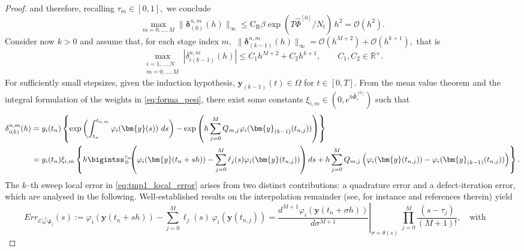 \documentclass[a4paper,num-refs]{oup-contemporary-spidec}
\begin{document}
\begin{proof}
    and therefore, recalling $\tau_m\in[0,1],$ we conclude
    \begin{equation*}
        \max_{m=0,\dots,M}\|\bm{\delta}^{n,m}_{(0)}(h)\|_\infty\leq \mathrm{C}_\mathrm{R}\beta \exp{(T\hat{\Phi}^{[0]}/N_t)} \, h^2 =\mathcal{O}(h^2).
    \end{equation*}
    Consider now $k>0$ and assume that, for each stage index $m,$ $\|\bm{\delta}^{n,m}_{(k-1)}(h)\|_\infty=\mathcal{O}(h^{M+2})+\mathcal{O}(h^{k+1}),$ that is
     \begin{equation}\label{eq:Induction_Hp}
        \max_{\substack{i=1,\dots,N \\ m=0,\dots,M}}|\delta^{n,m}_{i(k-1)}(h)|\leq C_1h^{M+2}+C_2h^{k+1}, \qquad C_1,C_2\in \mathbb{R}^+.
    \end{equation}
    For sufficiently small stepsizes, given the induction hypothesis, $\bm{y}_{(k-1)}(t)\in \Omega$ for $t\in[0,T].$ From the mean value theorem and the integral formulation of the weights in \eqref{eq:forma_pesi}, there exist some constants $\xi_{i,m}\in(0,e^{h\hat{\Phi}_i^{[0]}})$ such that
    \begin{equation}\label{eq:tmp1_local_error}
        \begin{split}
            \delta^{n,m}_{i(k)}(h)&=y_i(t_n)\left\{ \exp\left(\int_{t_n}^{t_{n,m}}\varphi_i(\bm{y}(s)) \ ds\right)-\exp\left(h\sum_{j=0}^MQ_{m,j}\varphi_i(\bm{y}_{(k-1)}(t_{n,j}))\right)\right\} \\
            &=y_i(t_n)\xi_{i,m}\left\{ h\bigintss_{ \, 0}^{\tau_m} \!\!\! \left(\varphi_i(\bm{y}(t_n+sh)) -\sum_{j=0}^M\ell_j(s)\varphi_i(\bm{y}(t_{n,j})) \right)  ds  +h\sum_{j=0}^MQ_{m,j}\left(\varphi_i(\bm{y}(t_{n,j}))- \varphi_i(\bm{y}_{(k-1)}(t_{n,j}))\right)\right\}.
        \end{split}
    \end{equation}
    The $k$--th sweep local error in \eqref{eq:tmp1_local_error} arises from two distinct contributions: a quadrature error and a defect-iteration error, which are analysed in the following. Well-established results on the interpolation remainder (see, for instance \cite[Theorem 8.2]{Quarteroni_2007} and references therein) yield
    \begin{equation*}
        Err_{\mathcal{E}^{-1}_M\bm{\varphi}_i}(s):=\varphi_i(\bm y(t_n+sh))
        -
        \sum_{j=0}^M \ell_j(s)\,
        \varphi_i(\bm y(t_{n,j}))
        =\left.\dfrac{d^{M+1}\varphi_i(\bm y(t_n+\sigma h))}{d\sigma^{M+1}}
        \right|_{\sigma=\theta(s)} \
        \prod_{j=0}^M \dfrac{(s-\tau_j)}{(M+1)!}, \quad \text{with} \quad \begin{array}{l}

\end{array}
\end{equation*}
\end{proof}
\end{document}
